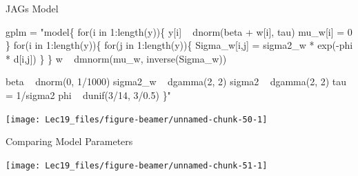 \documentclass[11pt,ignorenonframetext,]{beamer}
\newenvironment{Shaded}{}{}
\newcommand{\NormalTok}[1]{#1}
\newcommand{\StringTok}[1]{\textcolor[rgb]{0.25,0.44,0.63}{#1}}
\let\oldShaded\Shaded
\let\endoldShaded\endShaded
\renewenvironment{Shaded}{\footnotesize\begin{spacing}{0.9}\oldShaded}{\endoldShaded\end{spacing}}
\begin{document}
\begin{frame}[fragile]{JAGs Model}
\protect\hypertarget{jags-model}{}

\begin{Shaded}
\begin{Highlighting}[]
\NormalTok{gplm =}\StringTok{ "model\{}
\StringTok{  for(i in 1:length(y))\{}
\StringTok{    y[i] ~ dnorm(beta + w[i], tau)}
\StringTok{    mu_w[i] = 0}
\StringTok{  \}}
\StringTok{ }
\StringTok{  for(i in 1:length(y))\{}
\StringTok{    for(j in 1:length(y))\{}
\StringTok{      Sigma_w[i,j] = sigma2_w * exp(-phi * d[i,j])}
\StringTok{    \}}
\StringTok{  \}}
\StringTok{  w ~ dmnorm(mu_w, inverse(Sigma_w))}

\StringTok{  beta ~ dnorm(0, 1/1000)}
\StringTok{  sigma2_w ~ dgamma(2, 2)}
\StringTok{  sigma2 ~ dgamma(2, 2)}
\StringTok{  tau = 1/sigma2}
\StringTok{  phi ~ dunif(3/14, 3/0.5)}
\StringTok{\}"}
\end{Highlighting}
\end{Shaded}

\end{frame}

\begin{frame}{}
\protect\hypertarget{section-9}{}

\begin{center}\texttt{[image: Lec19\_files/figure-beamer/unnamed-chunk-50-1]} \end{center}

\end{frame}

\begin{frame}{Comparing Model Parameters}
\protect\hypertarget{comparing-model-parameters}{}

\begin{center}\texttt{[image: Lec19\_files/figure-beamer/unnamed-chunk-51-1]} \end{center}

\end{frame}
\end{document}
